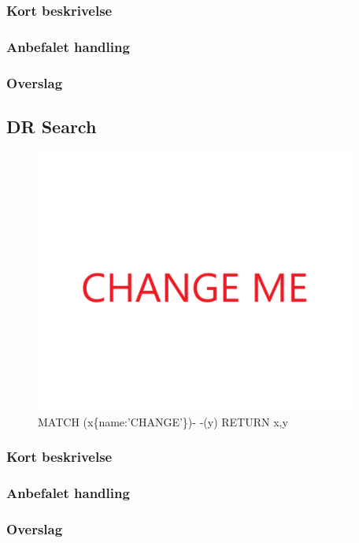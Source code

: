\documentclass{article}
\begin{document}
\subsubsection{Kort beskrivelse}
\subsubsection{Anbefalet handling}
\subsubsection{Overslag}


\subsection{DR Search}
\begin{figure}[h]
\includegraphics[width=300pt]{CHANGE.PNG}
\caption{MATCH (x\{name:'CHANGE'\})- -(y) RETURN x,y}
\end{figure}
\subsubsection{Kort beskrivelse}
\subsubsection{Anbefalet handling}
\subsubsection{Overslag}
\end{document}

